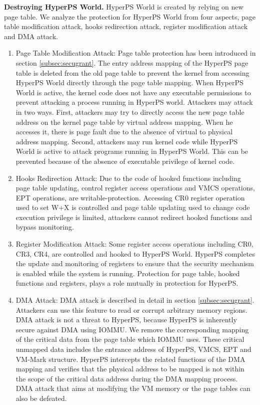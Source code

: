 \documentclass[10pt, numbers, preprint ]{sigplanconf}
\begin{document}
{\textbf{Destroying HyperPS World.} HyperPS World is created by relying on new page table. We analyze the protection for HyperPS World from four aspects, page table modification attack, hooks redirection attack, register modification attack and DMA attack.
\begin{enumerate}
	\item Page Table Modification Attack: Page table protection has been introduced in section \ref{subsec:secugrant}. The entry address mapping of the HyperPS page table is deleted from the old page table to prevent the kernel from accessing HyperPS World directly through the page table mapping. When HyperPS World is active, the kernel code does not have any executable permissions to prevent attacking a process running in HyperPS world. Attackers may attack in two ways. First, attackers may try to directly access the new page table address on the kernel page table by virtual address mapping. When he accesses it, there is page fault due to the absence of virtual to physical address mapping. Second, attackers may run kernel code while HyperPS World is active to attack programs running in HyperPS World. This can be prevented because of the absence of executable privilege of kernel code.
	\item Hooks Redirection Attack: Due to the code of hooked functions including page table updating, control register access operations and VMCS operations, EPT operations, are writable-protection. Accessing CR0 register operation used to set W+X is controlled and page table updating used to change code execution privilege is limited, attackers cannot redirect hooked functions and bypass monitoring.
	\item Register Modification Attack: Some register access operations including CR0, CR3, CR4, are controlled and hooked to HyperPS World. HyperPS completes the update and monitoring of registers to ensure that the security mechanism is enabled while the system is running. Protection for page table, hooked functions and registers, plays a role mutually in protection for HyperPS.
	\item DMA Attack: DMA attack is described in detail in section \ref{subsec:secugrant}. Attackers can use this feature to read or corrupt arbitrary memory regions. DMA attack is not a threat to HyperPS, because HyperPS is inherently secure against DMA using IOMMU. We remove the corresponding mapping of the critical data from the page table which IOMMU uses. These critical unmapped data includes the entrance address of HyperPS, VMCS, EPT and VM-Mark structure. HyperPS intercepts the related functions of the DMA mapping and verifies that the physical address to be mapped is not within the scope of the critical data address during the DMA mapping process. DMA attack that aims at modifying the VM memory or the page tables can also be defeated.
\end{enumerate}


}
\end{document}
